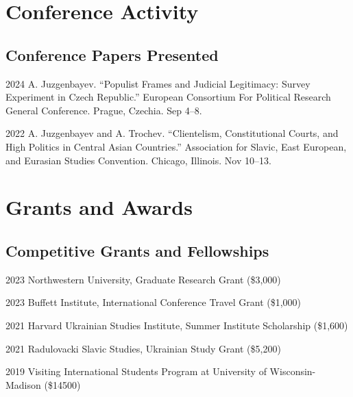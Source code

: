 \documentclass[11pt,letterpaper]{report}
\begin{document}
    


    \section*{Conference Activity}

    

    \subsection*{Conference Papers Presented}

    \begin{tablist}

        \item[2024] \tab{}A. Juzgenbayev. \enquote{Populist Frames and Judicial Legitimacy: Survey Experiment in Czech Republic.} European Consortium For Political Research General Conference.  Prague, Czechia. Sep 4--8. 

        \item[2022] \tab{}A. Juzgenbayev and A. Trochev. \enquote{Clientelism, Constitutional Courts, and High Politics in Central Asian Countries.} Association for Slavic, East European, and Eurasian Studies Convention. Chicago, Illinois. Nov 10--13.

    \end{tablist}



    \section*{Grants and Awards}



    \subsection*{Competitive Grants and Fellowships}

    \begin{tablist}


        \item[2023] \tab{}Northwestern University, Graduate Research Grant (\$3,000)

        \item[2023] \tab{}Buffett Institute, International Conference Travel Grant (\$1,000)
        \item[2021] \tab{}Harvard Ukrainian Studies Institute, Summer Institute Scholarship (\$1,600)
        \item[2021] \tab{}Radulovacki Slavic Studies, Ukrainian Study Grant (\$5,200)
        \item[2019] \tab{}Visiting International Students Program at University of Wisconsin-Madison (\$14500)

    \end{tablist}
\end{document}
